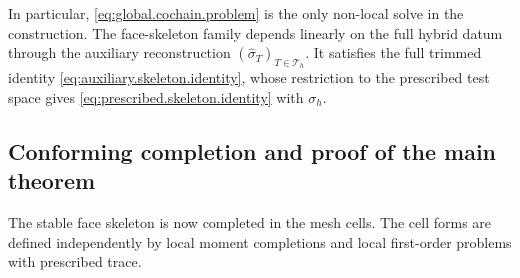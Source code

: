 \documentclass[a4paper,11pt]{article}
\theoremstyle{definition}
\begin{document}
In particular, \eqref{eq:global.cochain.problem} is the only non-local solve in the construction.
The face-skeleton family depends linearly on the full hybrid datum through the auxiliary reconstruction $(\widehat\sigma_T)_{T\in\mathcal T_h}$.
It satisfies the full trimmed identity \eqref{eq:auxiliary.skeleton.identity}, whose restriction to the prescribed test space gives \eqref{eq:prescribed.skeleton.identity} with $\sigma_h$.

\subsection{Conforming completion and proof of the main theorem}
\label{subsec:hybrid.completion}

The stable face skeleton is now completed in the mesh cells.
The cell forms are defined independently by local moment completions and local first-order problems with prescribed trace.

\stableconforminglifting*
\end{document}
